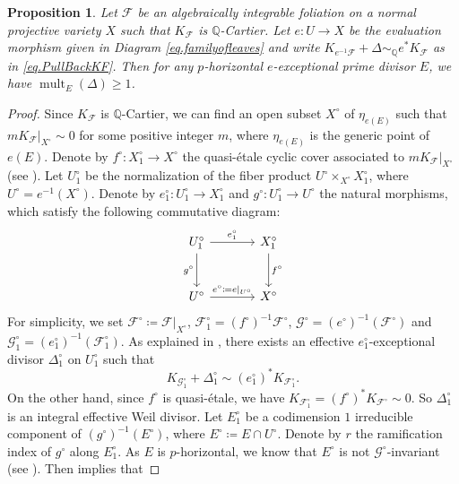 \documentclass[12pt,twoside]{amsart}
\DeclareMathOperator{\mult}{mult}
\newtheorem{prop}[thm]{Proposition}
\theoremstyle{definition}
\begin{document}
	
	\begin{prop}
		\label{prop.ExcDivFamLeaves}
		Let $\mathcal{F}$ be an algebraically integrable foliation on a normal projective variety $X$ such that $K_{\mathcal{F}}$ is $\mathbb{Q}$-Cartier. Let $e\colon U\rightarrow X$ be the evaluation morphism given in Diagram \eqref{eq.familyofleaves} and write $K_{e^{-1}\mathcal{F}}+\Delta \sim_{\mathbb{Q}} e^*K_{\mathcal{F}}$ as in \eqref{eq.PullBackKF}. Then for any $p$-horizontal $e$-exceptional prime divisor $E$, we have $\mult_E(\Delta)\geq 1$.
	\end{prop}
	
	\begin{proof}
 Since $K_{\mathcal{F}}$ is $\mathbb{Q}$-Cartier, we can find an open subset $X^{\circ}$ of $\eta_{e(E)}$ such that $mK_{\mathcal{F}}|_{X^{\circ}}\sim 0$ for some positive integer $m$, where $\eta_{e(E)}$ is the generic point of $e(E)$. Denote by $f^{\circ}\colon X_1^{\circ}\rightarrow X^{\circ}$ the quasi-\'etale cyclic cover associated to $mK_{\mathcal{F}}|_{X^{\circ}}$ (see \cite[\S\,3.6]{Druel2021}). Let $U_1^{\circ}$ be the normalization of the fiber product $U^{\circ}\times_{X^{\circ}} X_1^{\circ}$, where $U^{\circ}=e^{-1}(X^{\circ})$. Denote by $e^{\circ}_1\colon U_1^{\circ}\rightarrow X_1^{\circ}$ and $g^{\circ}\colon U_1^{\circ} \rightarrow U^{\circ}$ the natural morphisms, which satisfy the following commutative diagram:
		\[
		\begin{tikzcd}[row sep=large,column sep=large]
			U_1^{\circ} \arrow[d,"g^{\circ}" left] \arrow[r,"e_1^{\circ}"] 
			& X_1^{\circ} \arrow[d,"f^{\circ}"] \\
			U^{\circ} \arrow[r,"e^{\circ}\coloneqq e|_{U^{\circ}}"]
			& X^{\circ}
		\end{tikzcd}
		\]
		For simplicity, we set $\mathcal{F}^{\circ}\coloneqq \mathcal{F}|_{X^{\circ}}$, $\mathcal{F}_1^{\circ}=(f^{\circ})^{-1} \mathcal{F}^{\circ}$, $\mathcal{G}^{\circ}=(e^{\circ})^{-1}(\mathcal{F}^{\circ})$ and $\mathcal{G}_1^{\circ}=(e_1^{\circ})^{-1}(\mathcal{F}_1^{\circ})$. As explained in \cite[\S\,3.6]{Druel2021}, there exists an effective $e_1^{\circ}$-exceptional divisor $\Delta_1^{\circ}$ on $U_1^{\circ}$ such that
		\[
		K_{\mathcal{G}_1^{\circ}} + \Delta_1^{\circ} \sim (e_1^{\circ})^* K_{\mathcal{F}_1^{\circ}}.
		\]
		On the other hand, since $f^{\circ}$ is quasi-\'etale, we have $K_{\mathcal{F}_1^{\circ}} = (f^{\circ})^* K_{\mathcal{F}^{\circ}} \sim 0$.	So $\Delta_1^{\circ}$ is an integral effective Weil divisor. Let $E_1^{\circ}$ be a codimension $1$ irreducible component of $(g^{\circ})^{-1}(E^{\circ})$, where $E^{\circ}\coloneqq E\cap U^{\circ}$. Denote by $r$ the ramification index of $g^{\circ}$ along $E_1^{\circ}$. As $E$ is $p$-horizontal, we know that $E^{\circ}$ is not $\mathcal{G}^{\circ}$-invariant (see \cite[\S\,3.5]{Druel2021}). Then \cite[Lemma~3.4 (2)]{Druel2021} implies that

\end{proof}
\end{document}
